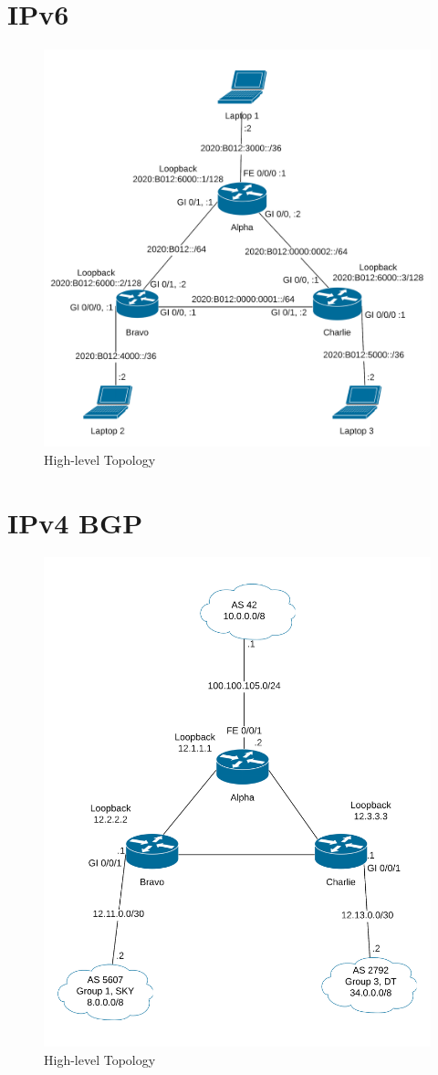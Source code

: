 \section{IPv6}
\begin{figure}[!ht]
	\caption{High-level Topology}
	\centering
	\includegraphics[width=\textwidth]{images/IPv6.png}
\end{figure}
\clearpage
\section{IPv4 BGP}
\begin{figure}[!ht]
	\caption{High-level Topology}
	\centering
	\includegraphics[width=\textwidth]{images/IPv4BGPPeers.png}
\end{figure}
\clearpage